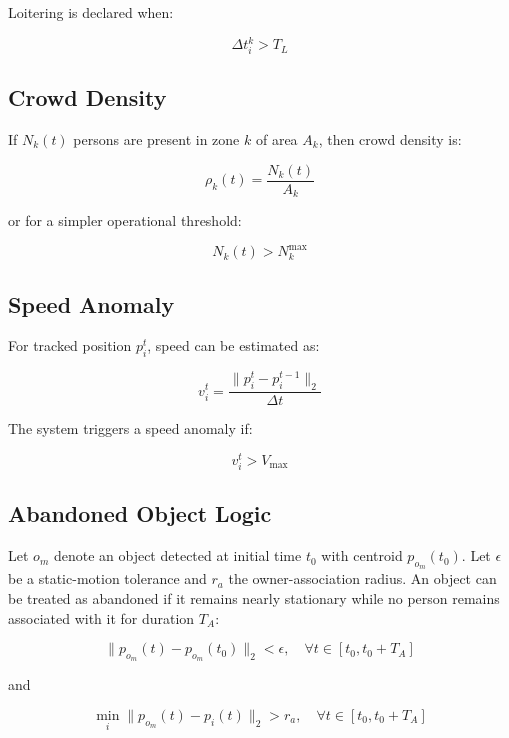 \documentclass[11pt]{article}
\begin{document}
Loitering is declared when:

\begin{equation}
\Delta t_i^k > T_L
\end{equation}

\subsection{Crowd Density}
If $N_k(t)$ persons are present in zone $k$ of area $A_k$, then crowd density is:

\begin{equation}
\rho_k(t) = \frac{N_k(t)}{A_k}
\end{equation}

or for a simpler operational threshold:

\begin{equation}
N_k(t) > N_k^{\max}
\end{equation}

\subsection{Speed Anomaly}
For tracked position $p_i^t$, speed can be estimated as:

\begin{equation}
v_i^t = \frac{\lVert p_i^t - p_i^{t-1} \rVert_2}{\Delta t}
\end{equation}

The system triggers a speed anomaly if:

\begin{equation}
v_i^t > V_{\max}
\end{equation}

\subsection{Abandoned Object Logic}
Let $o_m$ denote an object detected at initial time $t_0$ with centroid $p_{o_m}(t_0)$. Let $\epsilon$ be a static-motion tolerance and $r_a$ the owner-association radius. An object can be treated as abandoned if it remains nearly stationary while no person remains associated with it for duration $T_A$:

\begin{equation}
\lVert p_{o_m}(t) - p_{o_m}(t_0) \rVert_2 < \epsilon, \quad \forall t \in [t_0, t_0 + T_A]
\end{equation}

and

\begin{equation}
\min_i \lVert p_{o_m}(t) - p_i(t) \rVert_2 > r_a, \quad \forall t \in [t_0, t_0 + T_A]
\end{equation}
\end{document}

